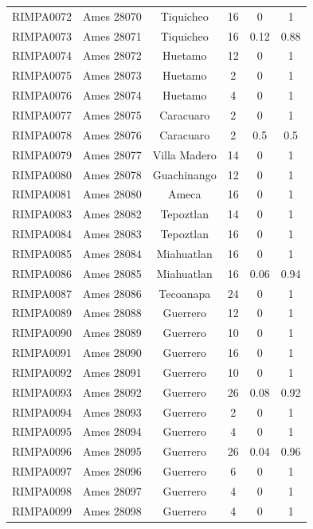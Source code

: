 \documentclass[11pt]{article}
\newcounter{rowno}
\begin{document}
\begin{scriptsize}
\begin{longtable}{>{\stepcounter{rowno}}cccccc}
    RIMPA0072 & Ames 28070 & Tiquicheo & 16    & 0     & 1 \\
    RIMPA0073 & Ames 28071 & Tiquicheo & 16    & 0.12 & 0.88 \\
    RIMPA0074 & Ames 28072 & Huetamo & 12    & 0     & 1 \\
    RIMPA0075 & Ames 28073 & Huetamo & 2     & 0     & 1 \\
    RIMPA0076 & Ames 28074 & Huetamo & 4     & 0     & 1 \\
    RIMPA0077 & Ames 28075 & Caracuaro & 2     & 0     & 1 \\
    RIMPA0078 & Ames 28076 & Caracuaro & 2     & 0.5   & 0.5 \\
    RIMPA0079 & Ames 28077 & Villa Madero & 14    & 0     & 1 \\
    RIMPA0080 & Ames 28078 & Guachinango & 12    & 0     & 1 \\
    RIMPA0081 & Ames 28080 & Ameca & 16    & 0     & 1 \\
    RIMPA0083 & Ames 28082 & Tepoztlan & 14    & 0     & 1 \\
    RIMPA0084 & Ames 28083 & Tepoztlan & 16    & 0     & 1 \\
    RIMPA0085 & Ames 28084 & Miahuatlan & 16    & 0     & 1 \\
    RIMPA0086 & Ames 28085& Miahuatlan & 16    & 0.06 & 0.94 \\
    RIMPA0087 & Ames 28086 & Tecoanapa & 24    & 0     & 1 \\
    RIMPA0089 & Ames 28088 & Guerrero & 12    & 0     & 1 \\
    RIMPA0090 & Ames 28089 & Guerrero & 10    & 0     & 1 \\
    RIMPA0091 & Ames 28090 & Guerrero & 16    & 0     & 1 \\
    RIMPA0092 & Ames 28091 & Guerrero & 10    & 0     & 1 \\
    RIMPA0093 & Ames 28092 & Guerrero & 26    & 0.08 & 0.92 \\
    RIMPA0094 & Ames 28093 & Guerrero & 2     & 0     & 1 \\
    RIMPA0095 & Ames	28094 & Guerrero & 4     & 0     & 1 \\
    RIMPA0096 & Ames	28095 & Guerrero & 26    & 0.04 & 0.96 \\
    RIMPA0097 & Ames	28096 & Guerrero & 6     & 0     & 1 \\
    RIMPA0098 & Ames	28097 & Guerrero & 4     & 0     & 1 \\
    RIMPA0099 & Ames	28098 & Guerrero & 4     & 0     & 1 \\

\end{longtable}
\end{scriptsize}
\end{document}
